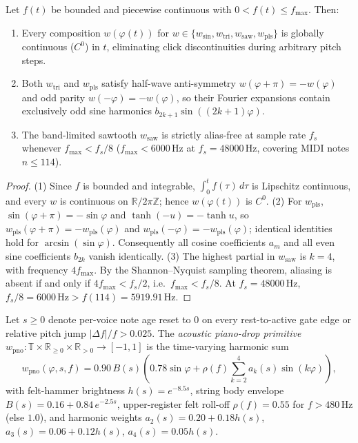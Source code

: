 \begin{theorem}
\label{thm:waveforms}
Let $f(t)$ be bounded and piecewise continuous with $0 < f(t) \le f_{\max}$. Then:
\begin{enumerate}[leftmargin=1.5em]
  \item Every composition $w(\varphi(t))$ for $w \in \{w_{\mathrm{sin}}, w_{\mathrm{tri}}, w_{\mathrm{saw}}, w_{\mathrm{pls}}\}$ is globally continuous ($C^0$) in $t$, eliminating click discontinuities during arbitrary pitch steps.
  \item Both $w_{\mathrm{tri}}$ and $w_{\mathrm{pls}}$ satisfy half-wave anti-symmetry $w(\varphi + \pi) = -w(\varphi)$ and odd parity $w(-\varphi) = -w(\varphi)$, so their Fourier expansions contain exclusively odd sine harmonics $b_{2k+1}\sin((2k+1)\varphi)$.
  \item The band-limited sawtooth $w_{\mathrm{saw}}$ is strictly alias-free at sample rate $f_s$ whenever $f_{\max} < f_s / 8$ ($f_{\max} < 6000\,\text{Hz}$ at $f_s = 48000\,\text{Hz}$, covering MIDI notes $n \le 114$).
\end{enumerate}
\end{theorem}

\begin{proof}
(1) Since $f$ is bounded and integrable, $\int_0^t f(\tau)\,d\tau$ is Lipschitz continuous, and every $w$ is continuous on $\mathbb{R}/2\pi\mathbb{Z}$; hence $w(\varphi(t))$ is $C^0$.
(2) For $w_{\mathrm{pls}}$, $\sin(\varphi + \pi) = -\sin\varphi$ and $\tanh(-u) = -\tanh u$, so $w_{\mathrm{pls}}(\varphi+\pi) = -w_{\mathrm{pls}}(\varphi)$ and $w_{\mathrm{pls}}(-\varphi) = -w_{\mathrm{pls}}(\varphi)$; identical identities hold for $\arcsin(\sin\varphi)$. Consequently all cosine coefficients $a_m$ and all even sine coefficients $b_{2k}$ vanish identically.
(3) The highest partial in $w_{\mathrm{saw}}$ is $k = 4$, with frequency $4 f_{\max}$. By the Shannon--Nyquist sampling theorem, aliasing is absent if and only if $4 f_{\max} < f_s / 2$, i.e.\ $f_{\max} < f_s / 8$. At $f_s = 48000\,\text{Hz}$, $f_s / 8 = 6000\,\text{Hz} > f(114) = 5919.91\,\text{Hz}$.
\end{proof}

\begin{definition}
\label{def:pno}
Let $s \ge 0$ denote per-voice note age reset to $0$ on every rest-to-active gate edge or relative pitch jump $|\Delta f|/f > 0.025$. The \emph{acoustic piano-drop primitive} $w_{\mathrm{pno}} : \mathbb{T} \times \mathbb{R}_{\ge 0} \times \mathbb{R}_{>0} \to [-1, 1]$ is the time-varying harmonic sum
\begin{equation}
\label{eq:pno}
w_{\mathrm{pno}}(\varphi, s, f) = 0.90\,B(s)\!\left(0.78\sin\varphi + \rho(f)\!\sum_{k=2}^{4} a_k(s)\sin(k\varphi)\right),
\end{equation}
with felt-hammer brightness $h(s) = e^{-8.5 s}$, string body envelope $B(s) = 0.16 + 0.84\,e^{-2.5 s}$, upper-register felt roll-off $\rho(f) = 0.55$ for $f > 480\,\text{Hz}$ (else $1.0$), and harmonic weights $a_2(s) = 0.20 + 0.18 h(s)$, $a_3(s) = 0.06 + 0.12 h(s)$, $a_4(s) = 0.05 h(s)$.
\end{definition}

